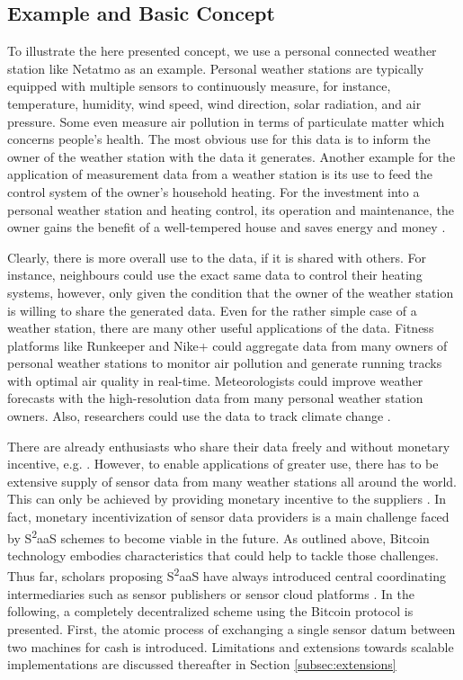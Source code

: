 \subsection{Example and Basic Concept}
To illustrate the here presented concept, we use a personal connected weather station like Netatmo \cite{netatmo} as an example. Personal weather stations are typically equipped with multiple sensors to continuously measure, for instance, temperature, humidity, wind speed, wind direction, solar radiation, and air pressure. Some even measure air pollution in terms of particulate matter which concerns people's health. The most obvious use for this data is to inform the owner of the weather station with the data it generates. Another example for the application of measurement data from a weather station is its use to feed the control system of the owner's household heating. For the investment into a personal weather station and heating control, its operation and maintenance, the owner gains the benefit of a well-tempered house and saves energy and money \cite{dong2014real}. 

Clearly, there is more overall use to the data, if it is shared with others. For instance, neighbours could use the exact same data to control their heating systems, however, only given the condition that the owner of the weather station is willing to share the generated data. Even for the rather simple case of a weather station, there are many other useful applications of the data. Fitness platforms like Runkeeper \cite{runkeeper.com} and Nike+ \cite{nikeplus.nike.com} could aggregate data from many owners of personal weather stations to monitor air pollution and generate running tracks with optimal air quality in real-time. Meteorologists could improve weather forecasts with the high-resolution data from many personal weather station owners. Also, researchers could use the data to track climate change \cite{JOC:JOC1276}.

There are already enthusiasts who share their data freely and without monetary incentive, e.g. \cite{wunderground.com}. However, to enable applications of greater use, there has to be extensive supply of sensor data from many weather stations all around the world. This can only be achieved by providing monetary incentive to the suppliers \cite{bohli2009initial}. In fact, monetary incentivization of sensor data providers is a main challenge faced by S\textsuperscript{2}aaS schemes to become viable in the future. As outlined above, Bitcoin technology embodies characteristics that could help to tackle those challenges. Thus far, scholars proposing S\textsuperscript{2}aaS have always introduced central coordinating intermediaries \cite{bohli2009initial} such as sensor publishers \cite{perera2014sensing} or sensor cloud platforms \cite{sheng2013sensing}. 
In the following, a completely decentralized scheme using the Bitcoin protocol is presented. First, the atomic process of exchanging a single sensor datum between two machines for cash is introduced. Limitations and extensions towards scalable implementations are discussed thereafter in Section \ref{subsec:extensions}

